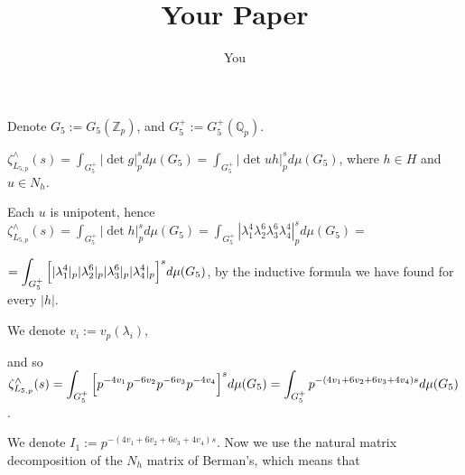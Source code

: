 \documentclass{article}
\title{Your Paper}
\author{You}
\begin{document}
\maketitle
Denote $G_{5}:=G_{5}(\mathbb{Z}_{p})$, and $G_{5}^{+}:=G_{5}^{+}(\mathbb{Q}_{p})$.

$\zeta_{L_{5,p}}^{\wedge}(s)=\displaystyle\int_{{G_{5}^{+}}}{|\det{g}|_{p}^{s}}d\mu(G_{5})=\displaystyle\int_{{G_{5}^{+}}}{|\det{uh}|_{p}^{s}}d\mu(G_{5})$, where $h\in{H}$ and $u\in{N_{h}}$. 

Each $u$ is unipotent, hence $\zeta_{L_{5,p}}^{\wedge}(s)=\displaystyle\int_{{G_{5}^{+}}}{|\det{h}|_{p}^{s}}d\mu(G_{5})=\displaystyle\int_{{G_{5}^{+}}}{|\lambda_{1}^{4}\lambda_{2}^{6}\lambda_{3}^{6}\lambda_{4}^{4}|_{p}^{s}}d\mu(G_{5})=$

$=\displaystyle\int_{{G_{5}^{+}}}{\Bigl[|\lambda_{1}^{4}|_{p}|\lambda_{2}^{6}|_{p}|\lambda_{3}^{6}|_{p}|\lambda_{4}^{4}|_{p}\Bigr]^{s}}d\mu(G_{5})$, by the inductive formula we have found for every $|h|$. 

We denote $v_{i}:=v_{p}(\lambda_{i})$, 

and so $\zeta_{L_{5,p}}^{\wedge}(s)=\displaystyle\int_{{G_{5}^{+}}}{\Bigl[p^{-4v_{1}}p^{-6v_{2}}p^{-6v_{3}}p^{-4v_{4}}\Bigr]^{s}}d\mu(G_{5})=\displaystyle\int_{{G_{5}^{+}}}{p^{-(4v_{1}+6v_{2}+6v_{3}+4v_{4})s}}d\mu(G_{5})$. 

We denote $I_{1}:=p^{-(4v_{1}+6v_{2}+6v_{3}+4v_{4})s}$.
Now we use the natural matrix decomposition of the $N_{h}$ matrix of Berman's, which means that
\end{document}

